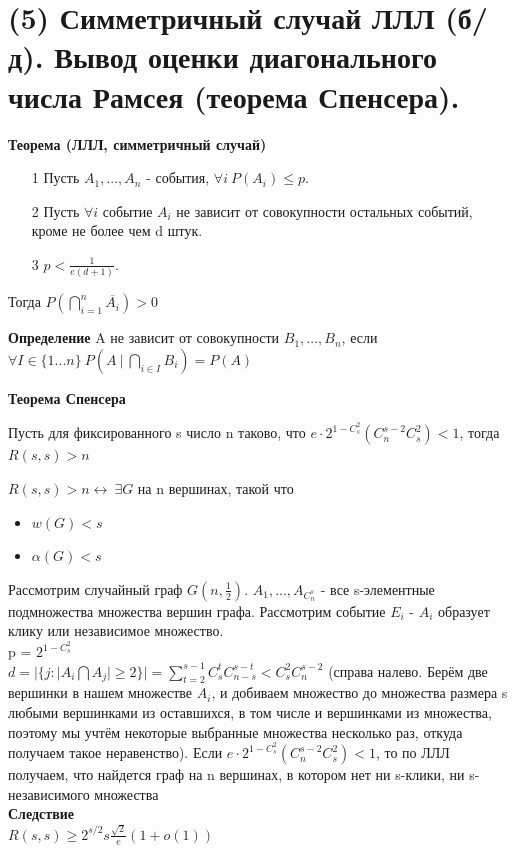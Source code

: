 \section{(5) Симметричный случай ЛЛЛ (б/д). Вывод оценки диагонального числа Рамсея (теорема Спенсера).}
\textbf{Теорема (ЛЛЛ, симметричный случай)}
\begin{itemize}
    \item [1]Пусть $A_1, ..., A_n$ - события,  $\forall i \ P(A_i) \leq p$.
    \item[2] Пусть $\forall i$ событие $A_i$ не зависит от совокупности остальных событий, кроме не более чем d штук.
    \item[3] $p < \frac{1}{e(d+1)}$. 
\end{itemize}
Тогда $P(\bigcap\limits_{i=1}^{n}\overline{A_i}) > 0$
 

\textbf{Определение} A не зависит от совокупности $B_1, ..., B_n$, если $\forall I \in \{1 ... n\} \ P(A \ |\ \bigcap\limits_{i \in I}B_i) = P(A) $

\textbf{Теорема Спенсера}
\begin{center}
Пусть для фиксированного s число n таково, что 
$e \cdot 2^{1-C_s^2}(C_{n}^{s-2}C_{s}^2) < 1$, тогда $R(s,s) > n$
\end{center}
\Proof 
 $R(s,s) > n \leftrightarrow \ \exists G$ на n вершинах, такой что 
    \begin{itemize}
        \item $w(G) < s$
        \item $\alpha(G) < s$
    \end{itemize}
    
Рассмотрим случайный граф $G(n, \frac{1}{2})$. $A_1, ..., A_{C_{n}^s}$ - все s-элементные подмножества множества вершин графа. Рассмотрим событие $E_i$ - $A_i$ образует клику или независимое множество.
\\
p = $2^{1 - C_s^2}$
\\
$d = |\{ j: |A_i \bigcap A_j| \geqslant 2\}| = \sum\limits_{t=2}^{s-1} C_s^tC_{n-s}^{s-t} < C_s^2C_{n}^{s-2}$ (справа налево. Берём две вершинки в нашем множестве $A_i$, и добиваем множество до множества размера s любыми вершинками из оставшихся, в том числе и вершинками из множества, поэтому мы учтём некоторые выбранные множества несколько раз, откуда получаем такое неравенство). Если $e \cdot 2^{1-C_s^2}(C_{n}^{s-2}C_{s}^2) < 1$, то по ЛЛЛ получаем, что найдется граф на n вершинах, в котором нет ни s-клики, ни s-независимого множества
\EndProof
\\
\textbf{Следствие}
\\
$R(s,s) \geqslant 2^{s/2}s\frac{\sqrt{2}}{e}(1+o(1))$
\\
\Proof

